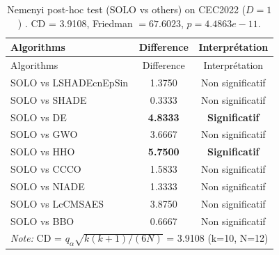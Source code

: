 \begin{center}
\small
\renewcommand{\arraystretch}{1.25}
\begin{longtable}{lcc}
\caption{Nemenyi post-hoc test (SOLO vs others) on CEC2022 ($D=1$) . CD = 3.9108, Friedman $=67.6023$, $p=4.4863e-11$.}
\label{tab:nemenyi_CEC2022_1} \\
\toprule
Algorithms & Difference & Interprétation \\
\midrule
\endfirsthead
\toprule
Algorithms & Difference & Interprétation \\
\midrule
\endhead
SOLO vs LSHADEcnEpSin & 1.3750 & Non significatif \\
SOLO vs SHADE & 0.3333 & Non significatif \\
SOLO vs DE & \textbf{4.8333} & \textbf{Significatif} \\
SOLO vs GWO & 3.6667 & Non significatif \\
SOLO vs HHO & \textbf{5.7500} & \textbf{Significatif} \\
SOLO vs CCCO & 1.5833 & Non significatif \\
SOLO vs NIADE & 1.3333 & Non significatif \\
SOLO vs LcCMSAES & 3.8750 & Non significatif \\
SOLO vs BBO & 0.6667 & Non significatif \\
\midrule
\multicolumn{3}{l}{\textit*{Note:} CD = $q_\alpha \sqrt{k(k+1)/(6N)}$ = 3.9108 (k=10, N=12)} \\
\bottomrule
\end{longtable}
\end{center}